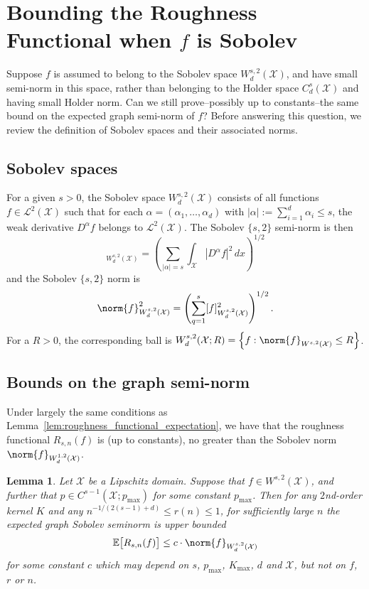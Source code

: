 \documentclass{article}
\newcommand{\abs}[1]{\left \lvert #1 \right \rvert}
\newcommand{\set}[1]{\left\{#1\right\}}
\newcommand{\1}{\mathbf{1}}
\newcommand{\Xset}{\mathcal{X}}
\newcommand{\Ebb}{\mathbb{E}}
\theoremstyle{alden}
\theoremstyle{aldenthm}
\newtheorem{lemma}{Lemma}
\theoremstyle{definition}
\theoremstyle{remark}
\begin{document}
\section{Bounding the Roughness Functional when $f$ is Sobolev}
Suppose $f$ is assumed to belong to the Sobolev space $W_d^{s,2}(\mathcal{X})$, and have small semi-norm in this space, rather than belonging to the Holder space $C_d^{s}(\Xset)$ and having small Holder norm. Can we still prove--possibly up to constants--the same bound on the expected graph semi-norm of $f$? Before answering this question, we review the definition of Sobolev spaces and their associated norms.

\subsection{Sobolev spaces}

For a given $s > 0$, the Sobolev space $W_d^{s,2}(\mathcal{X})$ consists of all functions $f \in \mathcal{L}^2(\mathcal{X})$ such that for each $\alpha = (\alpha_1,\ldots,\alpha_d)$ with $\abs{\alpha} := \sum_{i = 1}^{d} \alpha_i \leq s$, the weak derivative $D^{\alpha}f$ belongs to $\mathcal{L}^2(\mathcal{X})$. The Sobolev $\{s,2\}$ semi-norm is then 
\begin{equation*}
[f]_{W_d^{s,2}(\mathcal{X})} = \left(\sum_{\abs{\alpha} = s} \int_{\Xset} \abs{D^{\alpha}f}^2 \,dx\right)^{1/2}
\end{equation*}
and the Sobolev $\{s,2\}$ norm is 
\begin{equation*}
\norm{f}_{W_d^{s,2}(\mathcal{X})}^2 = \left(\sum_{q = 1}^{s} [f]_{W_d^{s,2}(\mathcal{X})}^2\right)^{1/2}.
\end{equation*}
For a $R > 0$, the corresponding ball is $W_d^{s,2}(\Xset; R) = \set{f: \norm{f}_{W^{s,2}(\Xset)} \leq R}$.

\subsection{Bounds on the graph semi-norm}

Under largely the same conditions as Lemma~\ref{lem:roughness_functional_expectation}, we have that the roughness functional $R_{s,n}(f)$ is (up to constants), no greater than the Sobolev norm $\norm{f}_{W_d^{1,2}(\mathcal{X})}$.
\begin{lemma}
	\label{lem:roughness_functional_expectation_sobolev}
	Let $\Xset$ be a Lipschitz domain. Suppose that $f \in W^{s,2}(\Xset)$, and further that $p \in C^{s-1}(\Xset;p_{\max})$ for some constant $p_{\max}$. Then for any $2$nd-order kernel $K$ and any $n^{-1/(2(s - 1) + d)} \leq r(n) \leq 1$, for sufficiently large $n$ the expected graph Sobolev seminorm is upper bounded
	\begin{equation}
	\label{eqn:roughness_functional_expectation_sobolev}
	\Ebb\bigl[R_{s,n}(f)\bigr] \leq c \cdot \norm{f}_{W_d^{s,2}(\Xset)}
	\end{equation}
	for some constant $c$ which may depend on $s$, $p_{\max}$, $K_{\max}$, $d$ and $\Xset$, but not on $f$, $r$ or $n$.
\end{lemma}
\end{document}
